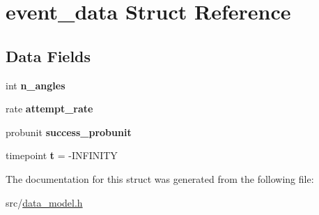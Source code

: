 \hypertarget{structevent__data}{}\section{event\+\_\+data Struct Reference}
\label{structevent__data}
\subsection*{Data Fields}
\begin{DoxyCompactItemize}
\item 
\mbox{\label{structevent__data_a4ac8163657589d149ed034f321b61ce9}} 
int {\bfseries n\+\_\+angles}
\item 
\mbox{\label{structevent__data_aa12da1e46a4e8e401433e90fd97fc015}} 
rate {\bfseries attempt\+\_\+rate}
\item 
\mbox{\label{structevent__data_ad6cde362c75774001ec8a7d24a580452}} 
probunit {\bfseries success\+\_\+probunit}
\item 
\mbox{\label{structevent__data_aa2f4362fb8d987420d6941e29cb50710}} 
timepoint {\bfseries t} = -\/I\+N\+F\+I\+N\+I\+TY
\end{DoxyCompactItemize}


The documentation for this struct was generated from the following file\+:\begin{DoxyCompactItemize}
\item 
src/\hyperlink{data__model_8h}{data\+\_\+model.\+h}\end{DoxyCompactItemize}
